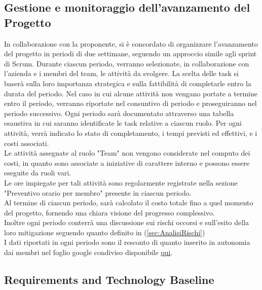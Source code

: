 \documentclass{article}
\begin{document}
\subsection{Gestione e monitoraggio dell'avanzamento del Progetto}
In collaborazione con la proponente, si è concordato di organizzare l'avanzamento del progetto in periodi di due settimane, seguendo un approccio simile agli sprint di Scrum. Durante ciascun periodo, verranno selezionate, in collaborazione con l'azienda e i membri del team, le attività da svolgere.
La scelta delle task si baserà sulla loro importanza strategica e sulla fattibilità di completarle entro la durata del periodo. Nel caso in cui alcune attività non vengano portate a termine entro il periodo, verranno riportate nel consuntivo di periodo e proseguiranno nel periodo successivo.
Ogni periodo sarà documentato attraverso una tabella esaustiva in cui saranno identificate le task relative a ciascun ruolo. Per ogni attività, verrà indicato lo stato di completamento, i tempi previsti ed effettivi, e i costi associati.
\\Le attività assegnate al ruolo "Team" non vengono considerate nel computo dei costi, in quanto sono associate a iniziative di carattere interno e possono essere eseguite da ruoli vari.
\\ Le ore impiegate per tali attività sono regolarmente registrate nella sezione "Preventivo orario per membro" presente in ciascun periodo.
\\Al termine di ciascun periodo, sarà calcolato il costo totale fino a quel momento del progetto, fornendo una chiara visione del progresso complessivo.
\\Inoltre ogni periodo conterrà una discussione sui rischi occorsi e sull'esito della loro mitigazione seguendo quanto definito in (\ref{sec:AnalisiRischi})\\
I dati riportati in ogni periodo sono il resconto di quanto inserito in autonomia dai membri nel foglio google condiviso disponibile
\href{https://docs.google.com/spreadsheets/d/1gbGCTKO6tLKN7lI9kTZHLpoItniJIi9X/edit?usp=sharing&ouid=104272518979154193028&rtpof=true&sd=true}{qui}.


\subsection{Requirements and Technology Baseline}
\end{document}
